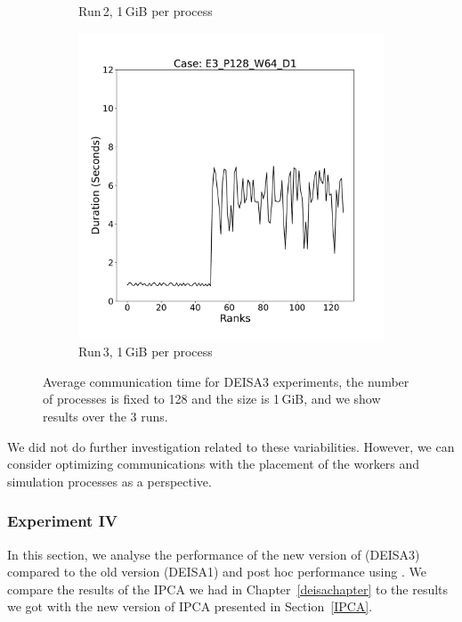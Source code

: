 \begin{figure}[h!]
\begin{subfigure}[b]{0.3\textwidth}
         \caption{Run\,2, 1\,GiB per process}
         \label{fig:E2_1_d3}
     \end{subfigure}
      \hfill
     \begin{subfigure}[b]{0.3\textwidth}
         \centering
         \includegraphics[width=\textwidth, height=\textwidth]{figures/E3_P128_W64_D1.pdf}
         \caption{Run\,3, 1\,GiB per process}
         \label{fig:E3_1_d3}
     \end{subfigure}
        \caption{Average communication time for DEISA3 experiments, the number of processes is fixed to 128 and the size is 1\,GiB, and we show results over the 3 runs.}
        \label{fig:variability3}
\end{figure}


We did not do further investigation related to these variabilities. However, we can consider optimizing communications with the placement of the workers and simulation processes as a perspective.

\subsubsection{Experiment IV}\label{XP4}
In this section, we analyse the performance of the new version of \deisa (DEISA3) compared to the old version (DEISA1) and post hoc performance using \dask. We compare the results of the IPCA we had in Chapter~\ref{deisachapter} to the results we got with the new version of IPCA presented in Section~\ref{IPCA}. 

